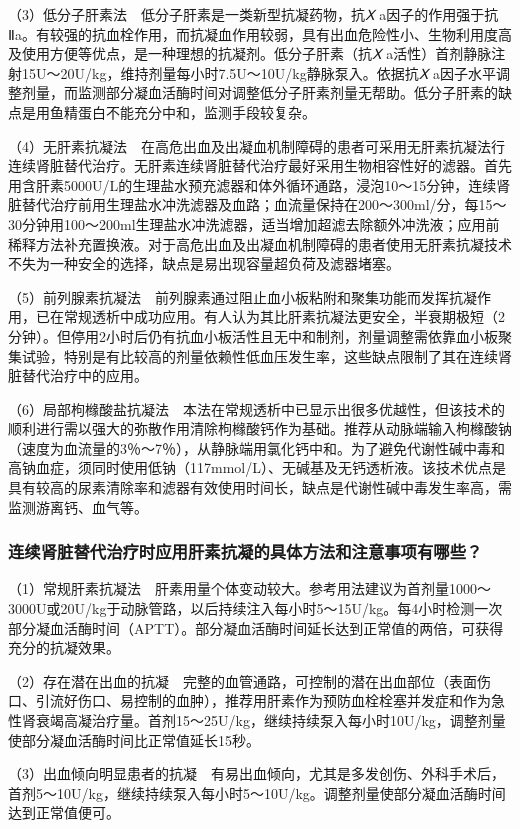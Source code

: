 （3）低分子肝素法　低分子肝素是一类新型抗凝药物，抗\emph{Ⅹ}
a因子的作用强于抗Ⅱa。有较强的抗血栓作用，而抗凝血作用较弱，具有出血危险性小、生物利用度高及使用方便等优点，是一种理想的抗凝剂。低分子肝素（抗\emph{Ⅹ}
a活性）首剂静脉注射15U～20U/kg，维持剂量每小时7.5U～10U/kg静脉泵入。依据抗\emph{Ⅹ}
a因子水平调整剂量，而监测部分凝血活酶时间对调整低分子肝素剂量无帮助。低分子肝素的缺点是用鱼精蛋白不能充分中和，监测手段较复杂。

（4）无肝素抗凝法　在高危出血及出凝血机制障碍的患者可采用无肝素抗凝法行连续肾脏替代治疗。无肝素连续肾脏替代治疗最好采用生物相容性好的滤器。首先用含肝素5000U/L的生理盐水预充滤器和体外循环通路，浸泡10～15分钟，连续肾脏替代治疗前用生理盐水冲洗滤器及血路；血流量保持在200～300ml/分，每15～30分钟用100～200ml生理盐水冲洗滤器，适当增加超滤去除额外冲洗液；应用前稀释方法补充置换液。对于高危出血及出凝血机制障碍的患者使用无肝素抗凝技术不失为一种安全的选择，缺点是易出现容量超负荷及滤器堵塞。

（5）前列腺素抗凝法　前列腺素通过阻止血小板粘附和聚集功能而发挥抗凝作用，已在常规透析中成功应用。有人认为其比肝素抗凝法更安全，半衰期极短（2分钟）。但停用2小时后仍有抗血小板活性且无中和制剂，剂量调整需依靠血小板聚集试验，特别是有比较高的剂量依赖性低血压发生率，这些缺点限制了其在连续肾脏替代治疗中的应用。

（6）局部枸橼酸盐抗凝法　本法在常规透析中已显示出很多优越性，但该技术的顺利进行需以强大的弥散作用清除枸橼酸钙作为基础。推荐从动脉端输入枸橼酸钠（速度为血流量的3％～7％），从静脉端用氯化钙中和。为了避免代谢性碱中毒和高钠血症，须同时使用低钠（117mmol/L）、无碱基及无钙透析液。该技术优点是具有较高的尿素清除率和滤器有效使用时间长，缺点是代谢性碱中毒发生率高，需监测游离钙、血气等。

\subsubsection{连续肾脏替代治疗时应用肝素抗凝的具体方法和注意事项有哪些？}

（1）常规肝素抗凝法　肝素用量个体变动较大。参考用法建议为首剂量1000～3000U或20U/kg于动脉管路，以后持续注入每小时5～15U/kg。每4小时检测一次部分凝血活酶时间（APTT）。部分凝血活酶时间延长达到正常值的两倍，可获得充分的抗凝效果。

（2）存在潜在出血的抗凝　完整的血管通路，可控制的潜在出血部位（表面伤口、引流好伤口、易控制的血肿），推荐用肝素作为预防血栓栓塞并发症和作为急性肾衰竭高凝治疗量。首剂15～25U/kg，继续持续泵入每小时10U/kg，调整剂量使部分凝血活酶时间比正常值延长15秒。

（3）出血倾向明显患者的抗凝　有易出血倾向，尤其是多发创伤、外科手术后，首剂5～10U/kg，继续持续泵入每小时5～10U/kg。调整剂量使部分凝血活酶时间达到正常值便可。

